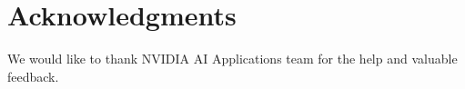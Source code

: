 \documentclass[a4paper]{article}
\begin{document}
\section{Acknowledgments}
We would like to thank NVIDIA AI Applications team for the help and valuable feedback.


\end{document}
